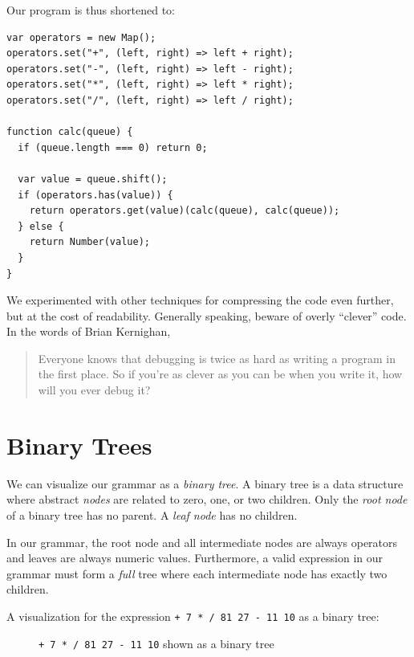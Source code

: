 \documentclass{book}
\begin{document}
Our program is thus shortened to:

\begin{lstlisting}
var operators = new Map();
operators.set("+", (left, right) => left + right);
operators.set("-", (left, right) => left - right);
operators.set("*", (left, right) => left * right);
operators.set("/", (left, right) => left / right);

function calc(queue) {
  if (queue.length === 0) return 0;

  var value = queue.shift();
  if (operators.has(value)) {
    return operators.get(value)(calc(queue), calc(queue));
  } else {
    return Number(value);
  }
}
\end{lstlisting}

We experimented with other techniques for compressing the code even further, but at the cost of readability. Generally speaking, beware of overly ``clever'' code. In the words of Brian Kernighan, 

\begin{quote}
Everyone knows that debugging is twice as hard as writing a program in the first place. So if you're as clever as you can be when you write it, how will you ever debug it?
\end{quote}

\section{Binary Trees}

We can visualize our grammar as a \textit{binary tree}. A binary tree is a data structure where abstract \textit{nodes} are related to zero, one, or two children. Only the \textit{root node} of a binary tree has no parent. A \textit{leaf node} has no children.

In our grammar, the root node and all intermediate nodes are always operators and leaves are always numeric values. Furthermore, a valid expression in our grammar must form a \textit{full} tree where each intermediate node has exactly two children.

A visualization for the expression \texttt{+ 7 * / 81 27 - 11 10} as a binary tree:

\begin{figure}[ht]
\label{polishExpressionTree}
\centering
{}
\caption{\texttt{+ 7 * / 81 27 - 11 10} shown as a binary tree}
\end{figure}
\end{document}
